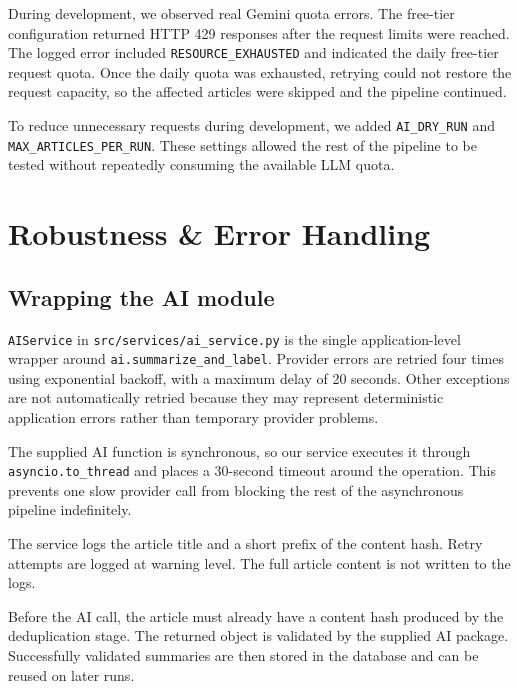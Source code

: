 \documentclass[11pt,a4paper]{article}
\begin{document}
During development, we observed real Gemini quota errors. The free-tier configuration returned HTTP 429 responses after the request limits were reached. The logged error included \texttt{RESOURCE\_EXHAUSTED} and indicated the daily free-tier request quota. Once the daily quota was exhausted, retrying could not restore the request capacity, so the affected articles were skipped and the pipeline continued.

To reduce unnecessary requests during development, we added \texttt{AI\_DRY\_RUN} and \texttt{MAX\_ARTICLES\_PER\_RUN}. These settings allowed the rest of the pipeline to be tested without repeatedly consuming the available LLM quota.

\section{Robustness \& Error Handling}\label{sec:robustness}

\subsection{Wrapping the AI module}

\texttt{AIService} in \texttt{src/services/ai\_service.py} is the single application-level wrapper around \texttt{ai.summarize\_and\_label}. Provider errors are retried four times using exponential backoff, with a maximum delay of 20 seconds. Other exceptions are not automatically retried because they may represent deterministic application errors rather than temporary provider problems.

The supplied AI function is synchronous, so our service executes it through \texttt{asyncio.to\_thread} and places a 30-second timeout around the operation. This prevents one slow provider call from blocking the rest of the asynchronous pipeline indefinitely.

The service logs the article title and a short prefix of the content hash. Retry attempts are logged at warning level. The full article content is not written to the logs.

Before the AI call, the article must already have a content hash produced by the deduplication stage. The returned object is validated by the supplied AI package. Successfully validated summaries are then stored in the database and can be reused on later runs.

\end{document}
